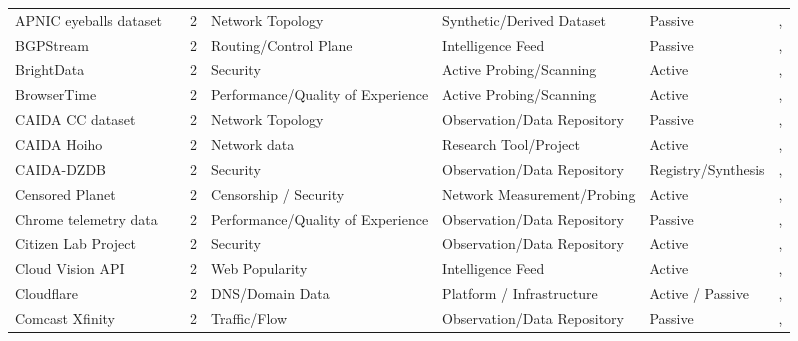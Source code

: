 \begin{table}[h!]
\begin{tabular}{lllllll}
APNIC eyeballs dataset & \cite{apnic_eyeballs} & 2 & Network Topology & Synthetic/Derived Dataset & Passive & \cite{10.1145/3487552.3487822}, \cite{10.1145/3777912.3839831} \\
BGPStream & \cite{bgpstream} & 2 & Routing/Control Plane & Intelligence Feed & Passive & \cite{10.1007/978-3-030-98785-5_20}, \cite{10.1145/3777912.3809145} \\
BrightData & \cite{brightdata} & 2 & Security & Active Probing/Scanning & Active & \cite{10.1145/3487552.3487849}, \cite{10.1007/978-3-031-85960-1_15} \\
BrowserTime & \cite{browsertime} & 2 & Performance/Quality of Experience & Active Probing/Scanning & Active & \cite{10.1145/3517745.3561416}, \cite{10.1007/978-3-031-28486-1_1} \\
CAIDA CC dataset & \cite{caida-cc-dataset} & 2 & Network Topology & Observation/Data Repository & Passive & \cite{10.1145/3618257.3624812}, \cite{10.1145/3487552.3487825} \\
CAIDA Hoiho & \cite{hoiho} & 2 & Network data & Research Tool/Project & Active & \cite{10.1145/3777912.3839791}, \cite{10.1145/3777912.3839795} \\
CAIDA-DZDB & \cite{caida-dzdb} & 2 & Security & Observation/Data Repository & Registry/Synthesis & \cite{10.1145/3517745.3561425}, \cite{10.1145/3487552.3487816} \\
Censored Planet & \cite{10.1145/3372297.3417883} & 2 & Censorship / Security & Network Measurement/Probing & Active & \cite{10.1007/978-3-030-98785-5_23}, \cite{10.1007/978-3-030-98785-5_28} \\
Chrome telemetry data & \cite{chrome-telemetry} & 2 & Performance/Quality of Experience & Observation/Data Repository & Passive & \cite{10.1145/3517745.3561418}, \cite{10.1145/3517745.3561444} \\
Citizen Lab Project & \cite{citizen-lab} & 2 & Security & Observation/Data Repository & Active & \cite{10.1145/3618257.3624817}, \cite{10.1145/3487552.3487836} \\
Cloud Vision API & \cite{google_cloud_vision} & 2 & Web Popularity & Intelligence Feed & Active & \cite{10.1145/3517745.3561460}, \cite{10.1145/3487552.3487850} \\
Cloudflare & \cite{cloudflare} & 2 & DNS/Domain Data & Platform / Infrastructure & Active / Passive & \cite{10.1145/3777912.3839811}, \cite{10.1145/3777912.3839791} \\
Comcast Xfinity & \cite{comcast-xfinity} & 2 & Traffic/Flow & Observation/Data Repository & Passive & \cite{10.1145/3487552.3487862}, \cite{10.1007/978-3-030-98785-5_4} \\

\end{tabular}
\end{table}
